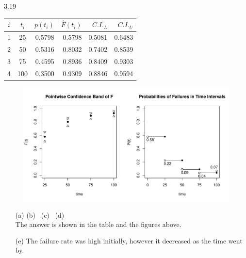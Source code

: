 \documentclass[paper=a4, fontsize=11pt]{scrartcl} %
\numberwithin{equation}{section} %
\numberwithin{figure}{section} %
\numberwithin{table}{section} %
\begin{document}
3.19

		\begin{table}[h]
			\begin{center}
			\begin{tabular}{ccrrrr}
				$i$  	& 	$t_i$ 	& $p(t_i)$ &	$\widehat{F}(t_i)$ & $C.I._L$ & $C.I._U$ \\ \hline
				1 & 25  &0.5798 &0.5798 &0.5081 &0.6483 \\
				2 & 50  &0.5316 &0.8032 &0.7402 &0.8539 \\
				3 & 75  &0.4595 &0.8936 &0.8409 &0.9303 \\
				4 &100 &0.3500 &0.9309 &0.8846 &0.9594
			\end{tabular}
			\end{center}
		\end{table}

		\begin{figure}[h]
			\includegraphics[width = 6 in]{3_19.pdf}
		\end{figure}		

\begin{itemize}
	\item[(a)]{(b) \ (c) \ (d)\\
		The answer is shown in the table and the figures above.
	}
	\item[(e)]{
		The failure rate was high initially, however it decreased as the time went by.
	}
\end{itemize}
\end{document}
